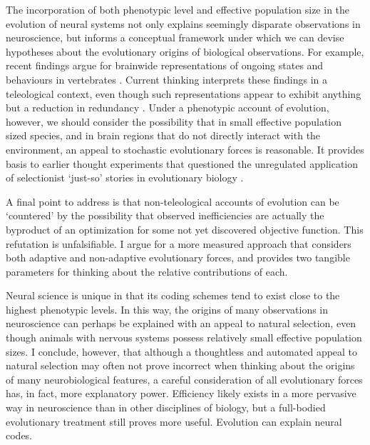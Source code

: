 \documentclass{article}
\begin{document}
The incorporation of both phenotypic level and effective population size in the evolution of neural systems not only explains seemingly disparate observations in neuroscience, but informs a conceptual framework under which we can devise hypotheses about the evolutionary origins of biological observations. For example, recent findings argue for brainwide representations of ongoing states and behaviours in vertebrates \cite{stringer_harris_2019, allen_deisseroth_2019}. Current thinking interprets these findings in a teleological context, even though such representations appear to exhibit anything but a reduction in redundancy \cite{kaplan_zimmer_2020}. Under a phenotypic account of evolution, however, we should consider the possibility that in small effective population sized species, and in brain regions that do not directly interact with the environment, an appeal to stochastic evolutionary forces is reasonable. It provides basis to earlier thought experiments that questioned the unregulated application of selectionist `just-so' stories in evolutionary biology  \cite{Gould_Lewontin_1979}.

A final point to address is that non-teleological accounts of evolution can be `countered' by the possibility that observed inefficiencies are actually the byproduct of an optimization for some not yet discovered objective function. This refutation is unfalsifiable. I argue for a more measured approach that considers both adaptive and non-adaptive evolutionary forces, and provides two tangible parameters for thinking about the relative contributions of each. 

Neural science is unique in that its coding schemes tend to exist close to the highest phenotypic levels. In this way, the origins of many observations in neuroscience can perhaps be explained with an appeal to natural selection, even though animals with nervous systems possess relatively small effective population sizes. I conclude, however, that although a thoughtless and automated appeal to natural selection may often not prove incorrect when thinking about the origins of many neurobiological features, a careful consideration of all evolutionary forces has, in fact, more explanatory power. Efficiency likely exists in a more pervasive way in neuroscience than in other disciplines of biology, but a full-bodied evolutionary treatment still proves more useful. Evolution can explain neural codes. 

\newpage
 



\end{document}
